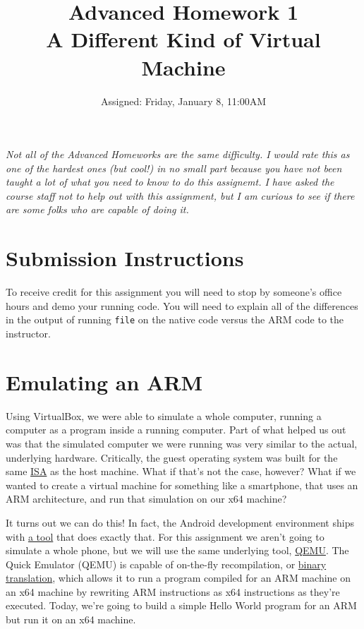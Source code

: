 \documentclass{article}
\begin{document}
\pagestyle{fancyplain}


\title{\textbf{Advanced Homework 1\\A Different Kind of Virtual Machine}}
\author{Assigned: Friday, January 8, 11:00AM}
\date{\textbf{\color{red}{Due: Friday, January 15, 11:00AM (Hard Deadline)}}}
\maketitle

\noindent
\emph{Not all of the Advanced Homeworks are the same difficulty. I would rate
  this as one of the hardest ones (but cool!) in no small part because you
  have not been taught a lot of what you need to know to do this assignemt.
  I have asked the course staff not to help out with this assignment, but I
  am curious to see if there are some folks who are capable of doing it.
}

\section*{Submission Instructions}
To receive credit for this assignment you will need to stop by someone's
office hours and demo your running code.
You will need to explain all of the differences in the output of running
\texttt{file} on the native code versus the ARM code to the instructor.


\section{Emulating an ARM}

Using VirtualBox, we were able to simulate a whole computer, running a
computer as a program inside a running computer. Part of what helped us out
was that the simulated computer we were running was very similar to the
actual, underlying hardware. Critically, the guest operating system was built
for the same \href{https://en.wikipedia.org/wiki/Instruction_set}{ISA} as the
host machine. What if that's not the case, however? What if we wanted to
create a virtual machine for something like a smartphone, that uses an ARM
architecture, and run that simulation on our x64 machine?

It turns out we can do this! In fact, the Android development environment ships
with \href{http://developer.android.com/tools/devices/emulator.html}{a tool}
that does exactly that. For this assignment we aren't going to simulate a
whole phone, but we will use the same underlying tool,
\href{http://qemu.org}{QEMU}. The Quick Emulator (QEMU) is capable of
on-the-fly recompilation, or
\href{https://en.wikipedia.org/wiki/Binary_translation}{binary translation},
which allows it to run a program compiled for an ARM machine on an x64 machine
by rewriting ARM instructions as x64 instructions as they're executed. Today,
we're going to build a simple Hello World program for an ARM but run it on an
x64 machine.
\end{document}
